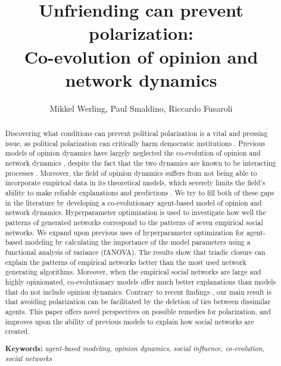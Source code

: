 \documentclass[11pt]{article}
\title{Unfriending can prevent polarization: 
\Large \\Co-evolution of opinion and network dynamics}
\author{Mikkel Werling, Paul Smaldino, Riccardo Fusaroli}
\date{}
\begin{document}
\maketitle
\thispagestyle{empty}
\vspace{10mm}

\newpage
\begin{abstract}
  \noindent Discovering what conditions can prevent political polarization is a vital and pressing issue, as political polarization can critically harm democratic institutions \cite{boxell_cross-country_2020, levin_dynamics_2021}. Previous models of opinion dynamics have largely neglected the co-evolution of opinion and network dynamics \cite{flache_models_2017, galesic_integrating_2021}, despite the fact that the two dynamics are known to be interacting processes \cite{bener_empirical_2016, mcpherson_birds_2001, kossinets_origins_2009}.
  Moreover, the field of opinion dynamics suffers from not being able to incorporate empirical data in its theoretical models, which severely limits the field's ability to make reliable explanations and predictions \cite{flache_models_2017,galesic_integrating_2021, mas2019challenges}.
  We try to fill both of these gaps in the literature by developing a co-evolutionary agent-based model of opinion and network dynamics. Hyperparameter optimization is used to investigate how well the patterns of generated networks correspond to the patterns of seven empirical social networks. We expand upon previous uses of hyperparameter optimization for agent-based modeling by calculating the importance of the model parameters using a functional analysis of variance (fANOVA).
  The results show that triadic closure can explain the patterns of empirical networks better than the most used network generating algorithms. Moreover, when the empirical social networks are large and highly opinionated, co-evolutionary models offer much better explanations than models that do not include opinion dynamics.
  Contrary to recent findings \cite{sasahara_social_2021}, our main result is that avoiding polarization can be facilitated by the deletion of ties between dissimilar agents. This paper offers novel perspectives on possible remedies for polarization, and improves upon the ability of previous models to explain how social networks are created. 
  
  \centering
  \vspace{3mm}
  \noindent \textbf{Keywords:} \textit{agent-based modeling, opinion dynamics, social influence, co-evolution, social networks}
\end{abstract}
\end{document}
